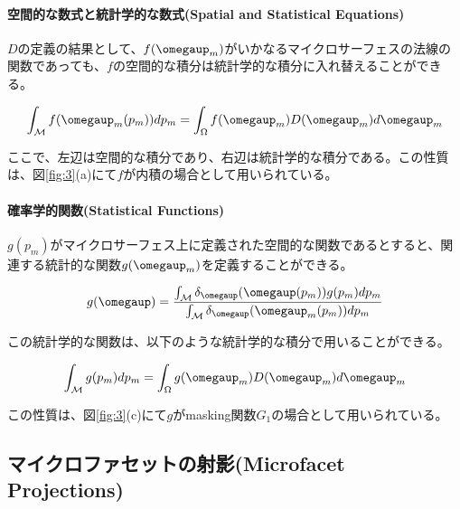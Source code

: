 \documentclass[a4j,xelatex,ja=standard]{bxjsarticle}
\begin{document}
\paragraph{空間的な数式と統計学的な数式(Spatial and Statistical Equations)}

$D$の定義の結果として、$f(\boldsymbol{\omegaup}_m)$がいかなるマイクロサーフェスの法線の関数であっても、$f$の空間的な積分は統計学的な積分に入れ替えることができる。

\begin{equation}
    \int_{\mathcal M} f(\boldsymbol{\omegaup}_m(p_m))dp_m = \int_{\Omega}f(\boldsymbol{\omegaup}_m) D(\boldsymbol{\omegaup}_m)d\boldsymbol{\omegaup}_m
    \label{eq:6}
\end{equation}

ここで、左辺は空間的な積分であり、右辺は統計学的な積分である。この性質は、図\ref{fig:3}(a)にて$f$が内積の場合として用いられている。

\paragraph{確率学的関数(Statistical Functions)}

$g(p_m)$がマイクロサーフェス上に定義された空間的な関数であるとすると、関連する統計的な関数$g(\boldsymbol{\omegaup}_m)$を定義することができる。

\begin{equation}
    g(\boldsymbol{\omegaup}) = \frac{\int_{\mathcal M} \delta_{\boldsymbol{\omegaup}}(\boldsymbol{\omegaup}(p_m)) g(p_m) dp_m}{\int_{\mathcal M} \delta_{\boldsymbol{\omegaup}}(\boldsymbol{\omegaup}_m(p_m)) dp_m}
    \label{eq:7}
\end{equation}

この統計学的な関数は、以下のような統計学的な積分で用いることができる。

\begin{equation}
    \int_{\mathcal M} g(p_m)dp_m = \int_{\Omega}g(\boldsymbol{\omegaup}_m) D(\boldsymbol{\omegaup}_m)d\boldsymbol{\omegaup}_m
    \label{eq:8}
\end{equation}

この性質は、図\ref{fig:3}(c)にて$g$がmasking関数$G_1$の場合として用いられている。

\subsection{マイクロファセットの射影(Microfacet Projections)}
\label{sec:2.3}
\end{document}
